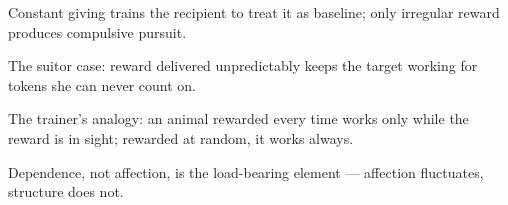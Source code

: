

\begin{distilled}
  \item Constant giving trains the recipient to treat it as baseline; only irregular reward produces compulsive pursuit.
  \item The suitor case: reward delivered unpredictably keeps the target working for tokens she can never count on.
  \item The trainer's analogy: an animal rewarded every time works only while the reward is in sight; rewarded at random, it works always.
  \item Dependence, not affection, is the load-bearing element --- affection fluctuates, structure does not.
\end{distilled}
